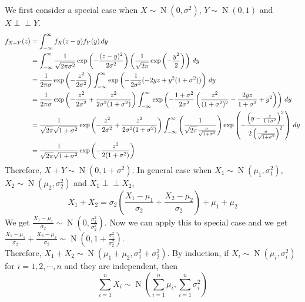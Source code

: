 \documentclass{huhtakm-template-book}
\newcommand{\independent}{\perp\!\!\!\perp}
\DeclareMathOperator{\N}{N}
\begin{document}
\begin{proofing}
	We first consider a special case when $X\sim\N(0,\sigma^{2})$, $Y\sim\N(0,1)$ and $X\independent Y$.
	\begin{align*}
		f_{X+Y}(z)&=\int_{-\infty}^{\infty} f_{X}(z-y)f_{Y}(y)\,dy\\
		&=\int_{-\infty}^{\infty}\frac{1}{\sqrt{2\pi\sigma^{2}}}\exp\left(-\frac{(z-y)^{2}}{2\sigma^{2}}\right)\left(\frac{1}{\sqrt{2\pi}}\exp\left(-\frac{y^{2}}{2}\right)\right)\,dy\\
		&=\frac{1}{2\pi\sigma}\exp\left(-\frac{z^{2}}{2\sigma^{2}}\right)\int_{-\infty}^{\infty}\exp\left(-\frac{1}{2\sigma^{2}}(-2yz+y^{2}(1+\sigma^{2}))\right)\,dy\\
		&=\frac{1}{2\pi\sigma}\exp\left(-\frac{z^{2}}{2\sigma^{2}}+\frac{z^{2}}{2\sigma^{2}(1+\sigma^{2})}\right)\int_{-\infty}^{\infty}\exp\left(-\frac{1+\sigma^{2}}{2\sigma^{2}}\left(\frac{z^{2}}{(1+\sigma^{2})^{2}}-\frac{2yz}{1+\sigma^{2}}+y^{2}\right)\right)\,dy\\
		&=\frac{1}{\sqrt{2\pi}\sqrt{1+\sigma^{2}}}\exp\left(-\frac{z^{2}}{2\sigma^{2}}+\frac{z^{2}}{2\sigma^{2}(1+\sigma^{2})}\right)\int_{-\infty}^{\infty}\left(\frac{1}{\sqrt{2\pi}\frac{\sigma}{\sqrt{1+\sigma^{2}}}}\right)\exp\left(-\frac{\left(y-\frac{z}{1+\sigma^{2}}\right)^{2}}{2\left(\frac{\sigma}{\sqrt{1+\sigma^{2}}}\right)^{2}}\right)\,dy\\
		&=\frac{1}{\sqrt{2\pi}\sqrt{1+\sigma^{2}}}\exp\left(-\frac{z^{2}}{2(1+\sigma^{2})}\right)
	\end{align*}
	Therefore, $X+Y\sim\N(0,1+\sigma^{2})$. In general case when $X_{1}\sim\N(\mu_{1},\sigma_{1}^{2})$, $X_{2}\sim\N(\mu_{2},\sigma_{2}^{2})$ and $X_{1}\independent X_{2}$,
	\begin{equation*}
		X_{1}+X_{2}=\sigma_{2}\left(\frac{X_{1}-\mu_{1}}{\sigma_{2}}+\frac{X_{2}-\mu_{2}}{\sigma_{2}}\right)+\mu_{1}+\mu_{2}
	\end{equation*}
	We get $\frac{X_{1}-\mu_{1}}{\sigma_{2}}\sim\N\left(0,\frac{\sigma_{1}^{2}}{\sigma_{2}^{2}}\right)$. Now we can apply this to special case and we get $\frac{X_{1}-\mu_{1}}{\sigma_{2}}+\frac{X_{2}-\mu_{2}}{\sigma_{2}}\sim\N\left(0,1+\frac{\sigma_{1}^{2}}{\sigma_{2}^{2}}\right)$.\\
	Therefore, $X_{1}+X_{2}\sim\N(\mu_{1}+\mu_{2},\sigma_{1}^{2}+\sigma_{2}^{2})$. By induction, if $X_{i}\sim\N(\mu_{i},\sigma_{i}^{2})$ for $i=1,2,\cdots,n$ and they are independent, then
	\begin{equation*}
		\sum_{i=1}^{n}X_{i}\sim\N\left(\sum_{i=1}^{n}\mu_{i},\sum_{i=1}^{n}\sigma_{i}^{2}\right)
	\end{equation*}
\end{proofing}
\end{document}
